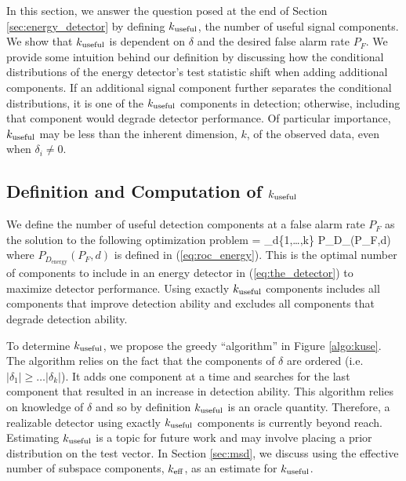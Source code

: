 In this section, we answer the question posed at the end of Section
\ref{sec:energy_detector} by defining $k_{\text{useful}}$, the number of useful signal components. We
show that $k_{\text{useful}}$ is dependent on $\delta$ and the desired false alarm rate $P_F$. We
provide some intuition behind our definition by discussing how the conditional
distributions of the energy detector's test statistic shift when adding additional
components. If an additional signal component further separates the conditional
distributions, it is one of the $k_{\text{useful}}$ components in detection; otherwise, including that
component would degrade detector performance. Of particular importance, $k_{\text{useful}}$ may be
less than the inherent dimension, $k$, of the observed data, even when $\delta_i\neq0$.

\subsection{Definition and Computation of $k_{\text{useful}}$}

We define the number of useful detection components at a false alarm rate $P_F$ as the
solution to the following optimization problem
\beq\label{eq:opt_prob}
\kuse = \argmax_{d\in\{1,\dots,k\}} P_{D_{}}(P_F,d)
\eeq 
where $P_{D_{\text{energy}}}(P_F,d)$ is defined in (\ref{eq:roc_energy}). This is the
optimal number of components to include in an energy detector in (\ref{eq:the_detector})
to maximize detector performance. Using exactly $k_{\text{useful}}$ components includes all components
that improve detection ability and excludes all components that degrade detection ability.

To determine $k_{\text{useful}}$, we propose the greedy ``algorithm'' in Figure \ref{algo:kuse}. The
algorithm relies on the fact that the components of $\delta$ are ordered
(i.e. $|\delta_1|\geq\dots|\delta_k|$). It adds one component at a time and searches for
the last component that resulted in an increase in detection ability. This algorithm
relies on knowledge of $\delta$ and so by definition $k_{\text{useful}}$ is an oracle quantity.
Therefore, a realizable detector using exactly $k_{\text{useful}}$ components is currently beyond
reach. Estimating $k_{\text{useful}}$ is a topic for future work and may involve placing a prior
distribution on the test vector. In Section \ref{sec:msd}, we discuss using the effective
number of subspace components, $k_\text{eff}$, as an estimate for $k_{\text{useful}}$.



